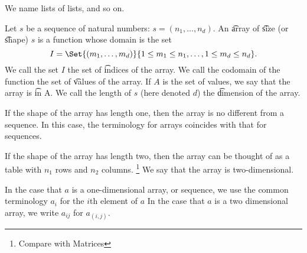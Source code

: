

We name lists of lists, and so on.


Let $s$ be a sequence of natural numbers: $s = (n_1, \dots, n_d)$.
An \t{array} of \t{size} (or \t{shape}) $s$ is a function whose domain is the set
  \[
I = \Set{(m_1, \dots, m_d)}{ 1 \leq m_1 \leq n_1, \dots, 1 \leq m_d \leq n_d}.
  \]
We call the set $I$ the set of \t{indices} of the array.
We call the codomain of the function the set of \t{values} of the array.
If $A$ is the set of values, we say that the array is \t{in} A.
We call the length of $s$ (here denoted $d$) the \t{dimension} of the array.


If the shape of the array has length one, then the array is no different from a sequence.
In this case, the terminology for arrays coincides with that for sequences.


If the shape of the array has length two, then the array can be thought of as a table with $n_1$ rows and $n_2$ columns.
  \ifhmode\unskip\fi\footnote{
Compare with  {Matrices}
  }
We say that the array is two-dimensional.


In the case that $a$ is a one-dimensional array, or sequence, we use the common terminology $a_i$ for the $i$th element of $a$
In the case that $a$ is a two dimensional array, we write $a_{ij}$ for $a_{(i,j)}$.
